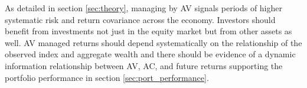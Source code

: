 

As detailed in section \ref{sec:theory}, \citet{pollet_average_2010} managing by AV signals periods of higher systematic risk and return covariance across the economy. Investors should benefit from investments not just in the equity market but from other assets as well. AV managed returns should depend systematically on the relationship of the observed index and aggregate wealth and there should be evidence of a dynamic information relationship between AV, AC, and future returns supporting the portfolio performance in section \ref{sec:port_performance}.